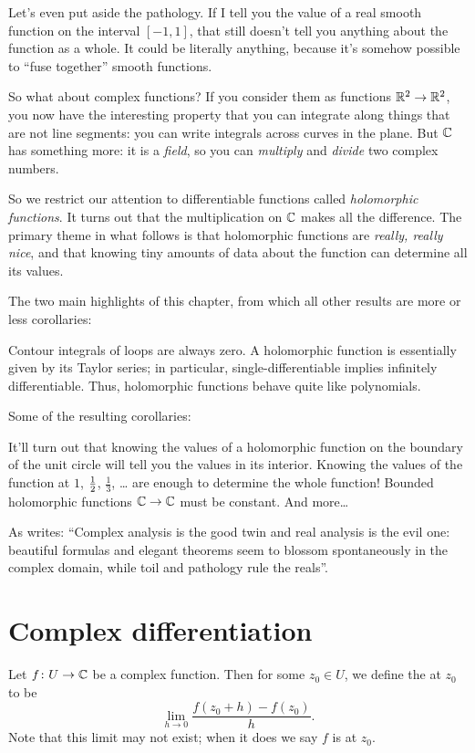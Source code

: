 Let's even put aside the pathology.
If I tell you the value of a real smooth function on the interval $[-1, 1]$,
that still doesn't tell you anything about the function as a whole.
It could be literally anything, because it's somehow possible to ``fuse together'' smooth functions.

So what about complex functions?
If you consider them as functions $\mathbb R^2 \to \mathbb R^2$, you now have the interesting property
that you can integrate along things that are not line segments: you can write integrals
across curves in the plane.
But $\mathbb C$ has something more: it is a \emph{field}, so you can \emph{multiply} and \emph{divide} two complex numbers.

So we restrict our attention to differentiable functions called \emph{holomorphic functions}.
It turns out that the multiplication on $\mathbb C$ makes all the difference.
The primary theme in what follows is that holomorphic functions are \emph{really, really nice},
and that knowing tiny amounts of data about the function can determine all its values.

The two main highlights of this chapter,
from which all other results are more or less corollaries:
\begin{itemize}
	\ii Contour integrals of loops are always zero.
	\ii A holomorphic function is essentially given by its Taylor series;
	in particular, single-differentiable implies infinitely differentiable.
	Thus, holomorphic functions behave quite like polynomials.
\end{itemize}
Some of the resulting corollaries:
\begin{itemize}
	\ii It'll turn out that knowing the values of a holomorphic function
	on the boundary of the unit circle will tell you the values in its interior.
	\ii Knowing the values of the function at $1$, $\frac{1}{2}$, $\frac13$, \dots
	are enough to determine the whole function!
	\ii Bounded holomorphic functions $\mathbb C \to \mathbb C$ must be constant.
	\ii And more\dots
\end{itemize}

As \cite{ref:pugh} writes: ``Complex analysis is the good twin and real analysis is the evil one: beautiful formulas and elegant theorems seem to blossom spontaneously in the complex domain, while toil and pathology rule the reals''.


\section{Complex differentiation}
Let $f \colon U \to \mathbb C$ be a complex function.
Then for some $z_0 \in U$, we define the  at $z_0$ to be
\[
	\lim_{h \to 0} \frac{f(z_0+h) - f(z_0)}{h}.
\]
Note that this limit may not exist;
when it does we say $f$ is  at $z_0$.

